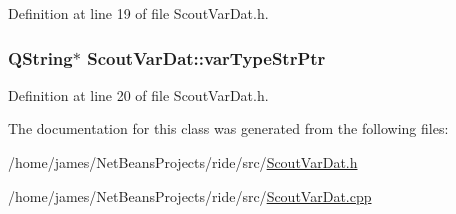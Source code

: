 Definition at line 19 of file Scout\-Var\-Dat.\-h.

\hypertarget{class_scout_var_dat_a83360e9bfcdd440aecbd4c8e99c3ab08}{
\subsubsection[{var\-Type\-Str\-Ptr}]{\setlength{\rightskip}{0pt plus 5cm}Q\-String$\ast$ Scout\-Var\-Dat\-::var\-Type\-Str\-Ptr\hspace{0.3cm}{\ttfamily [private]}}}\label{class_scout_var_dat_a83360e9bfcdd440aecbd4c8e99c3ab08}


Definition at line 20 of file Scout\-Var\-Dat.\-h.



The documentation for this class was generated from the following files\-:\begin{DoxyCompactItemize}
\item 
/home/james/\-Net\-Beans\-Projects/ride/src/\hyperlink{_scout_var_dat_8h}{Scout\-Var\-Dat.\-h}\item 
/home/james/\-Net\-Beans\-Projects/ride/src/\hyperlink{_scout_var_dat_8cpp}{Scout\-Var\-Dat.\-cpp}\end{DoxyCompactItemize}

